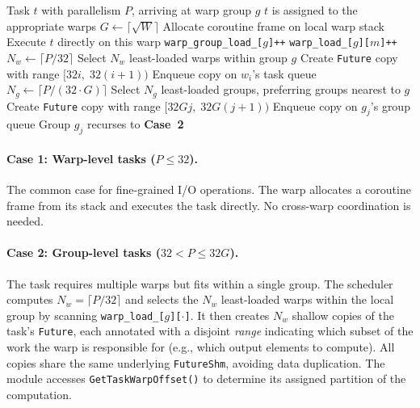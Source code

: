 \begin{algorithm}[t]
\caption{Multi-level task dispatch}
\label{alg:dispatch}
\begin{algorithmic}[1]
\Require Task $t$ with parallelism $P$, arriving at warp group $g$
\Ensure $t$ is assigned to the appropriate warps
\State $G \gets \lceil\sqrt{W}\rceil$ 
 
    \State Allocate coroutine frame on local warp stack
    \State Execute $t$ directly on this warp
    \State \texttt{warp\_group\_load\_[$g$]}\texttt{++}
    \State \texttt{warp\_load\_[$g$][$m$]}\texttt{++}
 
    \State $N_w \gets \lceil P / 32 \rceil$
    \State Select $N_w$ least-loaded warps within group $g$
        \State Create \texttt{Future} copy with range $[32i,\; 32(i+1))$
        \State Enqueue copy on $w_i$'s task queue
    \EndFor
\Else {}
    \State $N_g \gets \lceil P / (32 \cdot G) \rceil$
    \State Select $N_g$ least-loaded groups, preferring groups
           nearest to $g$
        \State Create \texttt{Future} copy with range
               $[32 G j,\; 32 G (j+1))$
        \State Enqueue copy on $g_j$'s group queue
        \State Group $g_j$ recurses to \textbf{Case~2}
    \EndFor
\EndIf
\end{algorithmic}
\end{algorithm}

\paragraph{Case 1: Warp-level tasks ($P \leq 32$).}
The common case for fine-grained I/O operations.  The warp allocates
a coroutine frame from its stack and executes the task directly.
No cross-warp coordination is needed.

\paragraph{Case 2: Group-level tasks ($32 < P \leq 32G$).}
The task requires multiple warps but fits within a single group.
The scheduler computes $N_w = \lceil P/32 \rceil$ and selects the
$N_w$ least-loaded warps within the local group by scanning
\texttt{warp\_load\_[$g$][$\cdot$]}.
It then creates $N_w$ shallow copies of the task's \texttt{Future},
each annotated with a disjoint \emph{range} indicating which
subset of the work the warp is responsible for (e.g., which
output elements to compute).  All copies share the same
underlying \texttt{FutureShm}, avoiding data duplication.
The module accesses \texttt{GetTaskWarpOffset()} to determine its
assigned partition of the computation.

